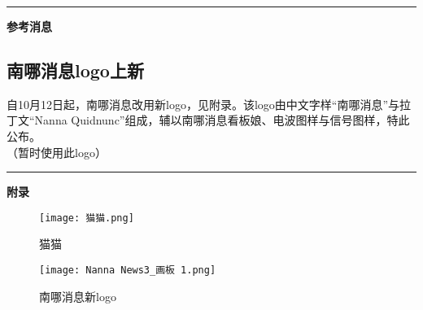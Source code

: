 \documentclass[letterpaper, 12pt]{article}
\begin{document}
\hrule
\vspace{4mm}
\centerline{\huge\textbf{参考消息}}
\begin{multicols}{2}
\section{南哪消息logo上新}
自10月12日起，南哪消息改用新logo，见附录。该logo由中文字样“南哪消息”与拉丁文“Nanna Quidnunc”组成，辅以南哪消息看板娘、电波图样与信号图样，特此公布。\\
（暂时使用此logo）
\end{multicols} 
\hrule
\vspace{4mm}
\centerline{\huge\textbf{附录}}
\begin{figure}[htbp]
    \centering
    \begin{minipage}[b]{0.32\textwidth}
        \centering
        \texttt{[image: 猫猫.png]}
        \caption{猫猫}
    \end{minipage}
\end{figure}
\begin{figure}[htbp]
    \centering
    \begin{minipage}[b]{0.32\textwidth}
        \centering
        \texttt{[image: Nanna News3\_画板 1.png]}
        \caption{南哪消息新logo}
    \end{minipage}
\end{figure}
\end{document}
